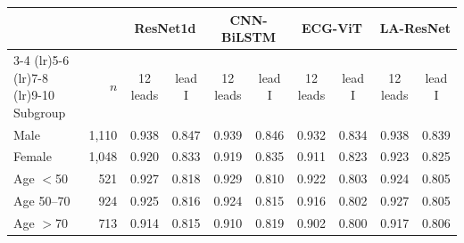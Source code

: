 \begin{tabular}{lrcccccccc}
\toprule
 & & \multicolumn{2}{c}{ResNet1d} & \multicolumn{2}{c}{CNN-BiLSTM} & \multicolumn{2}{c}{ECG-ViT} & \multicolumn{2}{c}{LA-ResNet} \\
\cmidrule(lr){3-4} \cmidrule(lr){5-6} \cmidrule(lr){7-8} \cmidrule(lr){9-10}
Subgroup & $n$ & 12 leads & lead I & 12 leads & lead I & 12 leads & lead I & 12 leads & lead I \\
\midrule
Male & 1,110 & 0.938 & 0.847 & 0.939 & 0.846 & 0.932 & 0.834 & 0.938 & 0.839 \\
Female & 1,048 & 0.920 & 0.833 & 0.919 & 0.835 & 0.911 & 0.823 & 0.923 & 0.825 \\
Age $<$50 & 521 & 0.927 & 0.818 & 0.929 & 0.810 & 0.922 & 0.803 & 0.924 & 0.805 \\
Age 50--70 & 924 & 0.925 & 0.816 & 0.924 & 0.815 & 0.916 & 0.802 & 0.927 & 0.805 \\
Age $>$70 & 713 & 0.914 & 0.815 & 0.910 & 0.819 & 0.902 & 0.800 & 0.917 & 0.806 \\
\bottomrule
\end{tabular}
